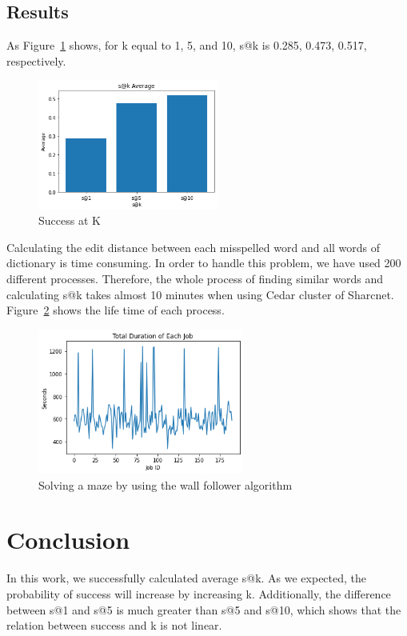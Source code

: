 \documentclass[sigconf]{acmart}
\begin{document}
\subsection{Results}
As Figure~\ref{fig:success_at_k} shows, for k equal to 1, 5, and 10, s@k is 0.285, 0.473, 0.517, respectively.
\begin{figure}[!htb]
\centerline{\includegraphics[width=14pc]{success_at_k.png}}
\caption{Success at K}
\label{fig:success_at_k}
\end{figure}
Calculating the edit distance between each misspelled word and all words of dictionary is time consuming. In order to handle this problem, we have used 200 different processes. Therefore, the whole process of finding similar words and calculating s@k takes almost 10 minutes when using Cedar cluster of Sharcnet. Figure~\ref{fig:job_seconds} shows the life time of each process.
\begin{figure}[!htb]
\centerline{\includegraphics[width=16pc]{job_seconds.png}}
\caption{Solving a maze by using the wall follower algorithm}
\label{fig:job_seconds}
\end{figure}

\section{Conclusion}
In this work, we successfully calculated average s@k. As we expected, the probability of success will increase by increasing k. Additionally, the difference between s@1 and s@5 is much greater than s@5 and s@10, which shows that the relation between success and k is not linear.
% 
%  
\end{document}
